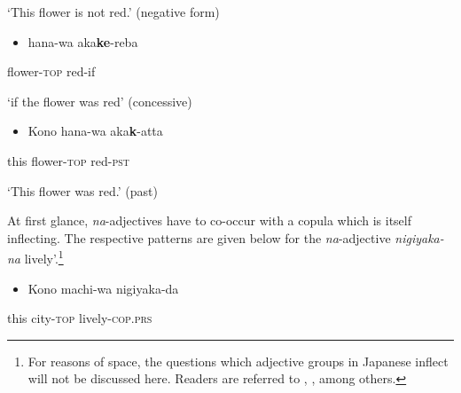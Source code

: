 \documentclass[output=paper]{langscibook}
\begin{document}
\begin{styleBeispielCinqueKapitel}
‘This flower is not red.’     (negative form)
\end{styleBeispielCinqueKapitel}

\begin{itemize}
\item \begin{styleBeispielCinqueKapitel}
hana-wa aka\textbf{ke}{}-reba
\end{styleBeispielCinqueKapitel}
\end{itemize}
\begin{styleBeispielCinqueKapitel}
flower-\textsc{top} red-if 
\end{styleBeispielCinqueKapitel}

\begin{styleBeispielCinqueKapitel}
‘if the flower was red’     (concessive)
\end{styleBeispielCinqueKapitel}

\begin{itemize}
\item \begin{styleBeispielCinqueKapitel}
\label{bkm:Ref164098433}Kono hana-wa aka\textbf{k}{}-atta 
\end{styleBeispielCinqueKapitel}
\end{itemize}
\begin{styleBeispielCinqueKapitel}
this flower-\textsc{top} red-\textsc{pst} 
\end{styleBeispielCinqueKapitel}

\begin{styleBeispielCinqueKapitel}
‘This flower was red.’     (past)
\end{styleBeispielCinqueKapitel}

At first glance, \textit{na}{}-adjectives have to co-occur with a copula which is itself inflecting. The respective patterns are given below for the \textit{na}{}-adjective \textit{nigiyaka-na} {\textasciigrave}lively’.\footnote{For reasons of space, the questions which adjective groups in Japanese inflect will not be discussed here. Readers are referred to \citet{Uehara1998}, \citet{Nishiyama1999}, \citet{Yamakido2005} among others.}

\begin{itemize}
\item \begin{styleBeispielCinqueKapitel}
Kono machi-wa nigiyaka-da
\end{styleBeispielCinqueKapitel}
\end{itemize}
\begin{styleBeispielCinqueKapitel}
this city-\textsc{top} lively-\textsc{cop.prs}
\end{styleBeispielCinqueKapitel}
\end{document}
